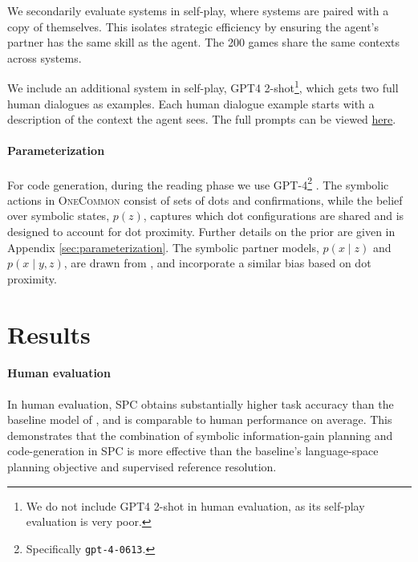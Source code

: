\documentclass[11pt]{article}
\newcommand{\system}{SPC}
\begin{document}
We secondarily evaluate systems in self-play, where systems are paired with a copy of themselves. This isolates strategic efficiency by ensuring the agent's partner has the same skill as the agent. The 200 games share the same contexts across systems.

We include an additional system in self-play, GPT4 2-shot\footnote{We do not include GPT4 2-shot in human evaluation, as its self-play evaluation is very poor.}, which gets two full human dialogues as examples. Each human dialogue example starts with a description of the context the agent sees.
The full prompts can be viewed \href{https://github.com/justinchiu/onecommon-gpt}{here}.


\paragraph{Parameterization}
For code generation, during the reading phase we use GPT-4\footnote{Specifically \texttt{gpt-4-0613}.} \citep{gpt4}.
The symbolic actions in \textsc{OneCommon} consist of sets of dots and confirmations, while the belief over symbolic states, $p(z)$,
captures which dot configurations are shared and is designed to account for dot proximity.
Further details on the prior are given in Appendix \ref{sec:parameterization}.
The symbolic partner models, $p(x\mid z)$ and $p(x\mid y,z)$, are drawn from \citet{ocp}, and incorporate a similar bias based on dot proximity.

\section{Results}

\paragraph{Human evaluation}
In human evaluation,
\system{} obtains substantially higher task accuracy than the baseline model of \citet{fried},
and is comparable to human performance on average. This demonstrates that the combination of symbolic information-gain planning and code-generation in \system{} is more effective than the baseline's language-space planning objective and supervised reference resolution.
\end{document}
